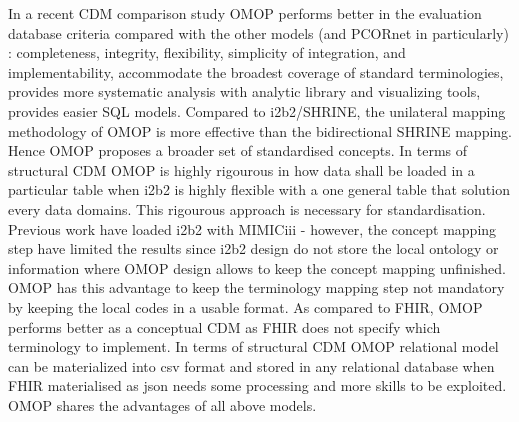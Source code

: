 In a recent CDM comparison study
\cite{cdm-review} OMOP performs better in the evaluation database criteria
compared with the other models (and PCORnet in particularly) : completeness,
integrity, flexibility, simplicity of integration, and implementability,
accommodate the broadest coverage of standard terminologies, provides more
systematic analysis with analytic library and visualizing tools, provides
easier SQL models.
Compared to i2b2/SHRINE, the unilateral mapping methodology of OMOP is more
effective than the bidirectional \cite{shrine-design} SHRINE mapping. Hence
OMOP proposes a broader set of standardised concepts. In terms of structural
CDM OMOP is highly rigourous in how data shall be loaded in a particular table
when i2b2 is highly flexible with a one general table that solution every data
domains. This rigourous approach is necessary for standardisation. Previous
work have loaded i2b2 with MIMICiii \cite{mimic-i2b2} - however, the concept
mapping step have limited the results since i2b2 design do not store the local
ontology or information where OMOP design allows to keep the concept mapping
unfinished. OMOP has this advantage to keep the terminology mapping step not
mandatory by keeping the local codes in a usable format.
As compared to FHIR, OMOP performs better as a conceptual CDM as FHIR does not
specify which terminology to implement. In terms of structural CDM OMOP
relational model can be materialized into csv format and stored in any
relational database when FHIR materialised as json needs some processing and
more skills to be exploited.  OMOP shares the advantages of all above models. 
\\


